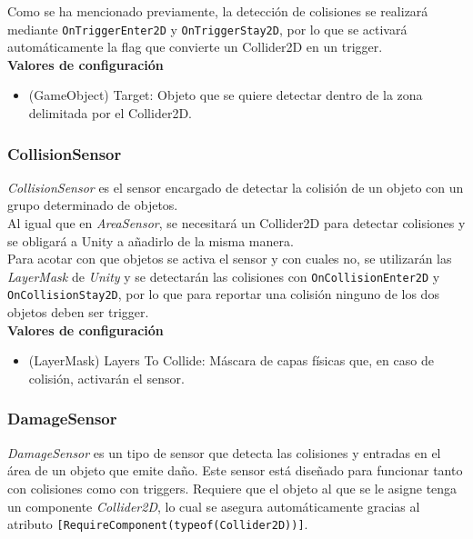 Como se ha mencionado previamente, la detección de colisiones se realizará mediante \texttt{OnTriggerEnter2D} y \texttt{OnTriggerStay2D}, por lo que se activará automáticamente la flag que convierte un Collider2D en un trigger.\\

\textbf{Valores de configuración}
\begin{itemize}
	\item (GameObject) Target: Objeto que se quiere detectar dentro de la zona delimitada por el Collider2D.
\end{itemize}

\subsubsection{CollisionSensor}

\textit{CollisionSensor} es el sensor encargado de detectar la colisión de un objeto con un grupo determinado de objetos.\\

Al igual que en \textit{AreaSensor}, se necesitará un Collider2D para detectar colisiones y se obligará a Unity a añadirlo de la misma manera.\\

Para acotar con que objetos se activa el sensor y con cuales no, se utilizarán las \textit{LayerMask} de \textit{Unity} y se detectarán las colisiones con \texttt{OnCollisionEnter2D} y \texttt{OnCollisionStay2D}, por lo que para reportar una colisión ninguno de los dos objetos deben ser trigger.\\

\textbf{Valores de configuración}
\begin{itemize}
	\item (LayerMask) Layers To Collide: Máscara de capas físicas que, en caso de colisión, activarán el sensor.
\end{itemize}

\subsubsection{DamageSensor}

\textit{DamageSensor} es un tipo de sensor que detecta las colisiones y entradas en el área de un objeto que emite daño. Este sensor está diseñado para funcionar tanto con colisiones como con triggers. Requiere que el objeto al que se le asigne tenga un componente \textit{Collider2D}, lo cual se asegura automáticamente gracias al atributo \texttt{[RequireComponent(typeof(Collider2D))]}.\\

